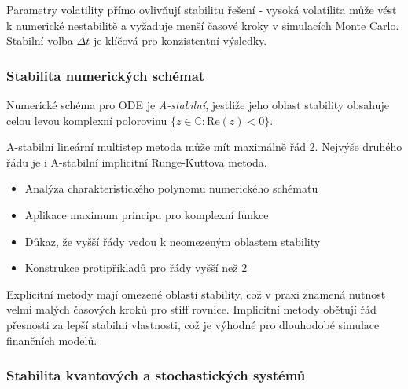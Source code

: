 \begin{keyinsight}
Parametry volatility přímo ovlivňují stabilitu řešení - vysoká volatilita může vést k numerické nestabilitě a vyžaduje menší časové kroky v simulacích Monte Carlo. Stabilní volba $\Delta t$ je klíčová pro konzistentní výsledky.
\end{keyinsight}

\subsubsection{Stabilita numerických schémat}

\begin{definition}[A-stabilita]
Numerické schéma pro ODE je \emph{A-stabilní}, jestliže jeho oblast stability obsahuje celou levou komplexní polorovinu $\{z \in \mathbb{C} : \mathrm{Re}(z) < 0\}$.
\end{definition}

\begin{theorem}
A-stabilní lineární multistep metoda může mít maximálně řád 2. Nejvýše druhého řádu je i A-stabilní implicitní Runge-Kuttova metoda.
\end{theorem}

\begin{proofsketch}
\begin{itemize}
\item Analýza charakteristického polynomu numerického schématu
\item Aplikace maximum principu pro komplexní funkce
\item Důkaz, že vyšší řády vedou k neomezeným oblastem stability
\item Konstrukce protipříkladů pro řády vyšší než 2
\end{itemize}
\end{proofsketch}

\begin{intuition}
Explicitní metody mají omezené oblasti stability, což v praxi znamená nutnost velmi malých časových kroků pro stiff rovnice. Implicitní metody obětují řád přesnosti za lepší stabilní vlastnosti, což je výhodné pro dlouhodobé simulace finančních modelů.
\end{intuition}

\subsubsection{Stabilita kvantových a stochastických systémů}

